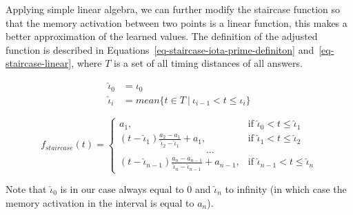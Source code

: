 Applying simple linear algebra, we can further modify the staircase function so that the memory activation between two points is a linear function, this makes a better approximation of the learned values. The definition of the adjusted function is described in Equations~\ref{eq-staircase-iota-prime-definiton} and~\ref{eq-staircase-linear}, where $T$ is a set of all timing distances of all answers.

\begin{equation} \label{eq-staircase-iota-prime-definiton}
\begin{split}
  \hat{\iota}_0 &= \iota_0 \\
  \hat{\iota}_i &= \mathit{mean}\{t \in T~|~\iota_{i-1} < t \leq \iota_i\}
\end{split}
\end{equation}

\begin{equation} \label{eq-staircase-linear}
  f_{\mathit{staircase}}(t) = \begin{cases}
            a_1, & \text{if } \hat{\iota}_0 < t \leq \hat{\iota}_1 \\
            (t - \hat{\iota}_1) \frac{a_2 - a_1}{\hat{\iota}_2 - \hat{\iota}_1} + a_1, & \text{if } \hat{\iota}_1 < t \leq \hat{\iota}_2 \\
            \hspace{9em} \dots \\
            (t - \hat{\iota}_{n-1}) \frac{a_n - a_{n-1}}{\hat{\iota}_n - \hat{\iota}_{n-1}} + a_{n-1}, & \text{if } \hat{\iota}_{n-1} < t \leq \hat{\iota}_n     
         \end{cases}
\end{equation}

Note that $\hat{\iota}_0$ is in our case always equal to $0$ and $\hat{\iota}_n$ to infinity (in which case the memory activation in the interval is equal to $a_n$).
